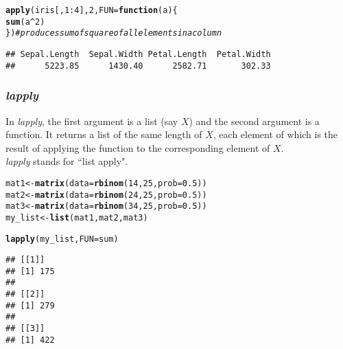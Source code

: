 \documentclass[11pt, a4paper]{article}\usepackage[]{graphicx}\usepackage[]{xcolor}
\makeatletter
\newcommand{\hlnum}[1]{\textcolor[rgb]{0.686,0.059,0.569}{#1}}%
\newcommand{\hlcom}[1]{\textcolor[rgb]{0.678,0.584,0.686}{\textit{#1}}}%
\newcommand{\hlopt}[1]{\textcolor[rgb]{0,0,0}{#1}}%
\newcommand{\hldef}[1]{\textcolor[rgb]{0.345,0.345,0.345}{#1}}%
\newcommand{\hlkwa}[1]{\textcolor[rgb]{0.161,0.373,0.58}{\textbf{#1}}}%
\newcommand{\hlkwb}[1]{\textcolor[rgb]{0.69,0.353,0.396}{#1}}%
\newcommand{\hlkwc}[1]{\textcolor[rgb]{0.333,0.667,0.333}{#1}}%
\newcommand{\hlkwd}[1]{\textcolor[rgb]{0.737,0.353,0.396}{\textbf{#1}}}%
\newenvironment{kframe}{%
 \def\at@end@of@kframe{}%
 \ifinner\ifhmode%
  \def\at@end@of@kframe{\end{minipage}}%
  \begin{minipage}{\columnwidth}%
 \fi\fi%
 \def\FrameCommand##1{\hskip\@totalleftmargin \hskip-\fboxsep
 \colorbox{shadecolor}{##1}\hskip-\fboxsep
     \hskip-\linewidth \hskip-\@totalleftmargin \hskip\columnwidth}%
 \MakeFramed {\advance\hsize-\width
   \@totalleftmargin\z@ \linewidth\hsize
   \@setminipage}}%
 {\par\unskip\endMakeFramed%
 \at@end@of@kframe}
\newenvironment{knitrout}{}{} %
\makeatother
\begin{document}
\begin{knitrout}
\color{fgcolor}\begin{kframe}
\begin{alltt}
\hlkwd{apply}\hldef{(iris[,} \hlnum{1}\hlopt{:}\hlnum{4}\hldef{],} \hlnum{2}\hldef{,} \hlkwc{FUN} \hldef{=} \hlkwa{function}\hldef{(}\hlkwc{a}\hldef{) \{}
    \hlkwd{sum}\hldef{(a}\hlopt{^}\hlnum{2}\hldef{)}
\hldef{\})}  \hlcom{# produces sum of square of all elements in a column}
\end{alltt}
\begin{verbatim}
## Sepal.Length  Sepal.Width Petal.Length  Petal.Width 
##      5223.85      1430.40      2582.71       302.33
\end{verbatim}
\end{kframe}
\end{knitrout}

\subsubsection{\textit{lapply}} In \textit{lapply}, the first argument is a list (say $X$) and the second argument is a function. It returns a list of the same length of $X$, each element of which is the result of applying the function to the corresponding element of $X$. \\

\textit{lapply} stands for ``list apply".

\begin{knitrout}
\color{fgcolor}\begin{kframe}
\begin{alltt}
\hldef{mat1} \hlkwb{<-} \hlkwd{matrix}\hldef{(}\hlkwc{data} \hldef{=} \hlkwd{rbinom}\hldef{(}\hlnum{14}\hldef{,} \hlnum{25}\hldef{,} \hlkwc{prob} \hldef{=} \hlnum{0.5}\hldef{))}
\hldef{mat2} \hlkwb{<-} \hlkwd{matrix}\hldef{(}\hlkwc{data} \hldef{=} \hlkwd{rbinom}\hldef{(}\hlnum{24}\hldef{,} \hlnum{25}\hldef{,} \hlkwc{prob} \hldef{=} \hlnum{0.5}\hldef{))}
\hldef{mat3} \hlkwb{<-} \hlkwd{matrix}\hldef{(}\hlkwc{data} \hldef{=} \hlkwd{rbinom}\hldef{(}\hlnum{34}\hldef{,} \hlnum{25}\hldef{,} \hlkwc{prob} \hldef{=} \hlnum{0.5}\hldef{))}
\hldef{my_list} \hlkwb{<-} \hlkwd{list}\hldef{(mat1, mat2, mat3)}

\hlkwd{lapply}\hldef{(my_list,} \hlkwc{FUN} \hldef{= sum)}
\end{alltt}
\begin{verbatim}
## [[1]]
## [1] 175
## 
## [[2]]
## [1] 279
## 
## [[3]]
## [1] 422
\end{verbatim}
\end{kframe}
\end{knitrout}
\end{document}
